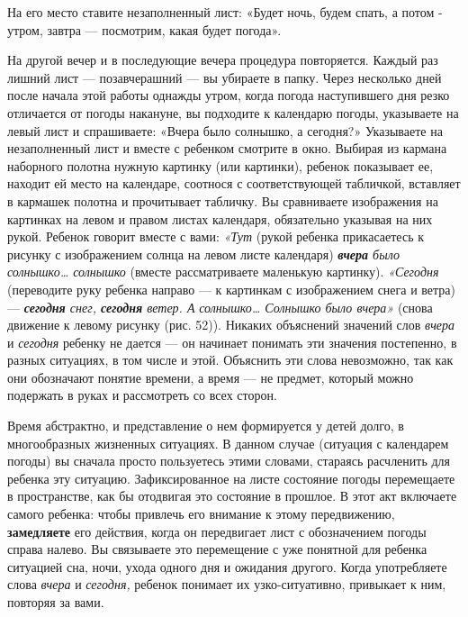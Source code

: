 \documentclass{book}
\renewcommand{\emph}[1]{\textit{#1}}
\begin{document}
На его место ставите незаполненный лист: «Будет ночь, будем спать, а
потом - утром, завтра --- посмотрим, какая будет погода».

На другой вечер и в последующие вечера процедура повторяется. Каждый раз
лишний лист --- позавчерашний --- вы убираете в папку. Через несколько
дней после начала этой работы однажды утром, когда погода наступившего
дня резко отличается от погоды накануне, вы подходите к календарю
погоды, указываете на левый лист и спрашиваете: «Вчера было солнышко, а
сегодня?» Указываете на незаполненный лист и вместе с ребенком смотрите
в окно. Выбирая из кармана наборного полотна нужную картинку (или
картинки), ребенок показывает ее, находит ей место на календаре,
соотнося с соответствующей табличкой, вставляет в кармашек полотна и
прочитывает табличку. Вы сравниваете изображения на картинках на левом и
правом листах календаря, обязательно указывая на них рукой. Ребенок
говорит вместе с вами: \emph{«Тут} (рукой ребенка прикасаетесь к рисунку
с изображением солнца на левом листе календаря) \emph{\textbf{вчера}
было солнышко\ldots{} солнышко} (вместе рассматриваете маленькую
картинку). \emph{«Сегодня} (переводите руку ребенка направо --- к
картинкам с изображением снега и ветра) --- \emph{\textbf{сегодня} снег,
\textbf{сегодня} ветер. А} \emph{солнышко\ldots{} Солнышко было вчера»}
(снова движение к левому рисунку (рис. 52)). Никаких объяснений значений
слов \emph{вчера} и \emph{сегодня} ребенку не дается --- он начинает
понимать эти значения постепенно, в разных ситуациях, в том числе и
этой. Объяснить эти слова невозможно, так как они обозначают понятие
времени, а время --- не предмет, который можно подержать в руках и
рассмотреть со всех сторон.

Время абстрактно, и представление о нем формируется у детей долго, в
многообразных жизненных ситуациях. В данном случае (ситуация с
календарем погоды) вы сначала просто пользуетесь этими словами, стараясь
расчленить для ребенка эту ситуацию. Зафиксированное на листе состояние
погоды перемещаете в пространстве, как бы отодвигая это состояние в
прошлое. В этот акт включаете самого ребенка: чтобы привлечь его
внимание к этому передвижению, \textbf{замедляете} его действия, когда
он передвигает лист с обозначением погоды справа налево. Вы связываете
это перемещение с уже понятной для ребенка ситуацией сна, ночи, ухода
одного дня и ожидания другого. Когда употребляете слова \emph{вчера} и
\emph{сегодня,} ребенок понимает их узко-ситуативно, привыкает к ним,
повторяя за вами.
\end{document}
